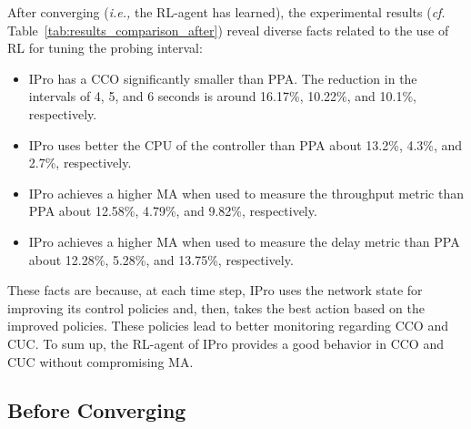 After converging (\textit{i.e.,} the RL-agent has learned), the experimental results (\textit{cf.} Table~\ref{tab:results_comparison_after}) reveal diverse facts related to the use of RL for tuning the probing interval:

\begin{itemize}
    \item IPro has a CCO significantly smaller than PPA. The reduction in the intervals of 4, 5, and 6 seconds is around 16.17\%, 10.22\%, and 10.1\%, respectively.
    \item IPro uses better the CPU of the controller than PPA about 13.2\%, 4.3\%, and 2.7\%, respectively.
    \item IPro achieves a higher MA when used to measure the throughput metric than PPA about 12.58\%, 4.79\%, and 9.82\%, respectively.
    \item IPro achieves a higher MA when used to measure the delay metric than PPA about 12.28\%, 5.28\%, and 13.75\%, respectively.
\end{itemize}{}

These facts are because, at each time step, IPro uses the network state for improving its control policies and, then, takes the best action based on the improved policies. These policies lead to better monitoring regarding CCO and CUC. To sum up, the RL-agent of IPro provides a good behavior in CCO and CUC without compromising MA.

\subsection{Before Converging}

